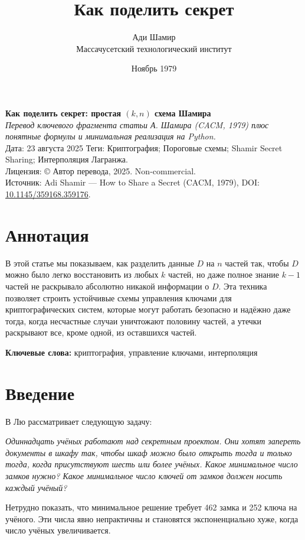 \documentclass[a4paper,12pt]{article}
\title{Как поделить секрет}
\author{Ади Шамир \\ Массачусетский технологический институт}
\date{Ноябрь 1979}
\begin{document}
\begin{center}
{\LARGE \textbf{Как поделить секрет: простая $(k, n)$ схема Шамира}}\\[0.5em]
\emph{Перевод ключевого фрагмента статьи А. Шамира (CACM, 1979) плюс понятные формулы и минимальная реализация на Python.}\\[0.5em]
\small Дата: 23 августа 2025 \quad
Теги: Криптография; Пороговые схемы; Shamir Secret Sharing; Интерполяция Лагранжа.\\[0.25em]
\small Лицензия: © Автор перевода, 2025. Non-commercial.\\[0.25em]
\small Источник: Adi Shamir — How to Share a Secret (CACM, 1979), DOI: \href{https://doi.org/10.1145/359168.359176}{10.1145/359168.359176}.
\end{center}

\vspace{1em}

\section*{Аннотация}
В этой статье мы показываем, как разделить данные $D$ на $n$ частей так,
чтобы $D$ можно было легко восстановить из любых $k$ частей, но даже полное
знание $k-1$ частей не раскрывало абсолютно никакой информации о $D$.
Эта техника позволяет строить устойчивые схемы управления ключами для
криптографических систем, которые могут работать безопасно и надёжно даже тогда,
когда несчастные случаи уничтожают половину частей, а утечки раскрывают все,
кроме одной, из оставшихся частей.

\textbf{Ключевые слова:} криптография, управление ключами, интерполяция

\section{Введение}

В \cite{liu1968} Лю рассматривает следующую задачу:

\emph{Одиннадцать учёных работают над секретным проектом. Они хотят
запереть документы в шкафу так, чтобы шкаф можно было открыть тогда и только тогда,
когда присутствуют шесть или более учёных. Какое минимальное число замков нужно?
Какое минимальное число ключей от замков должен носить каждый учёный?}

Нетрудно показать, что минимальное решение требует 462 замка и 252 ключа
на учёного. Эти числа явно непрактичны и становятся экспоненциально хуже,
когда число учёных увеличивается.
\end{document}
